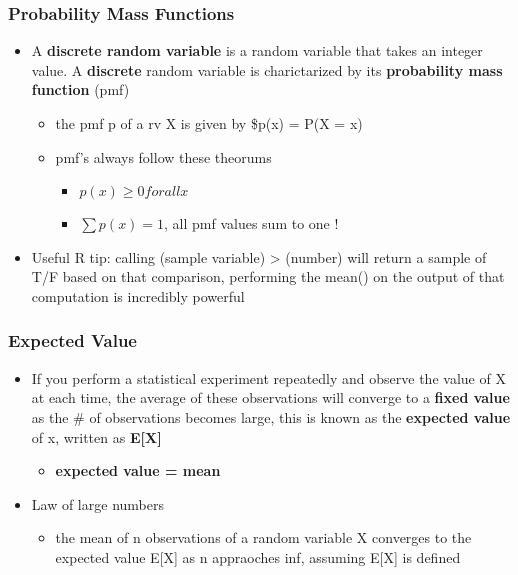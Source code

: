 \documentclass[
]{article}
\providecommand{\tightlist}{%
  \setlength{\itemsep}{0pt}\setlength{\parskip}{0pt}}
\begin{document}
\hypertarget{probability-mass-functions}{%
\subsubsection{Probability Mass
Functions}\label{probability-mass-functions}}

\begin{itemize}
\tightlist
\item
  A \textbf{discrete random variable} is a random variable that takes an
  integer value. A \textbf{discrete} random variable is charictarized by
  its \textbf{probability mass function} (pmf)

  \begin{itemize}
  \tightlist
  \item
    the pmf p of a rv X is given by \$p(x) = P(X = x)
  \item
    pmf's always follow these theorums

    \begin{itemize}
    \tightlist
    \item
      \(p(x) \geq 0 for all x\)
    \item
      \(\sum p(x) = 1\), all pmf values sum to one !
    \end{itemize}
  \end{itemize}
\item
  Useful R tip: calling (sample variable) \textgreater{} (number) will
  return a sample of T/F based on that comparison, performing the mean()
  on the output of that computation is incredibly powerful
\end{itemize}

\hypertarget{expected-value}{%
\subsubsection{Expected Value}\label{expected-value}}

\begin{itemize}
\tightlist
\item
  If you perform a statistical experiment repeatedly and observe the
  value of X at each time, the average of these observations will
  converge to a \textbf{fixed value} as the \# of observations becomes
  large, this is known as the \textbf{expected value} of x, written as
  \textbf{E{[}X{]}}

  \begin{itemize}
  \tightlist
  \item
    \textbf{expected value = mean}
  \end{itemize}
\item
  Law of large numbers

  \begin{itemize}
  \tightlist
  \item
    the mean of n observations of a random variable X converges to the
    expected value E{[}X{]} as n appraoches inf, assuming E{[}X{]} is
    defined
  \end{itemize}
\end{itemize}
\end{document}
